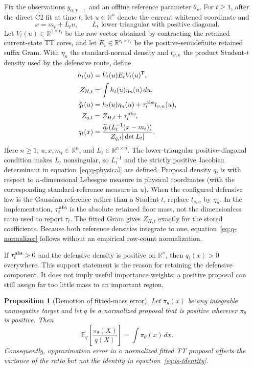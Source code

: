 \documentclass[11pt]{article}
\newtheorem{proposition}{Proposition}
\begin{document}
Fix the observations $y_{0:T-1}$ and an offline reference parameter
$\theta_\star$. For $t\geq1$, after the direct C2 fit at time $t$, let
$u\in\mathbb R^n$ denote the current whitened coordinate and
\begin{equation}\label{eq:proposal-map}
x=m_t+L_tu,
\qquad L_t\text{ lower triangular with positive diagonal}.
\end{equation}
Let $V_t(u)\in\mathbb R^{1\times r_t}$ be the row vector obtained by
contracting the retained current-state TT cores, and let
$E_t\in\mathbb R^{r_t\times r_t}$ be the positive-semidefinite retained suffix
Gram. With $\eta_n$ the standard-normal density and $t_{\nu,n}$ the product
Student-$t$ density used by the defensive route, define
\begin{align}
h_t(u)&=V_t(u)E_tV_t(u)^\mathsf T,\\
Z_{H,t}&=\int h_t(u)\eta_n(u)\,du,\\
\widetilde q_t(u)&=h_t(u)\eta_n(u)+\tau_t^{\rm abs}t_{\nu,n}(u),\\
Z_{q,t}&=Z_{H,t}+\tau_t^{\rm abs},\label{eq:q-normalizer}\\
q_t(x)&=\frac{\widetilde q_t(L_t^{-1}(x-m_t))}
 {Z_{q,t}|\det L_t|}.\label{eq:q-physical}
\end{align}
Here $n\geq1$, $u,x,m_t\in\mathbb R^n$, and
$L_t\in\mathbb R^{n\times n}$. The lower-triangular positive-diagonal
condition makes $L_t$ nonsingular, so $L_t^{-1}$ and the strictly positive
Jacobian determinant in equation~\eqref{eq:q-physical} are defined. Proposal
density $q_t$ is with respect to $n$-dimensional Lebesgue measure in physical
coordinates (with the corresponding standard-reference measure in $u$).
When the configured defensive law is the Gaussian reference rather than a
Student-$t$, replace $t_{\nu,n}$ by $\eta_n$. In the implementation,
$\tau_t^{\rm abs}$ is the absolute retained floor mass, not the dimensionless
ratio used to report $\tau_t$. The fitted Gram gives $Z_{H,t}$ exactly for the
stored coefficients. Because both reference densities integrate to one,
equation~\eqref{eq:q-normalizer} follows without an empirical row-count
normalization.

If $\tau_t^{\rm abs}>0$ and the defensive density is positive on
$\mathbb R^n$, then $q_t(x)>0$ everywhere. This support statement is the
reason for retaining the defensive component. It does not imply useful
importance weights: a positive proposal can still assign far too little mass
to an important region.

\begin{proposition}[Demotion of fitted-mass error]\label{prop:mass-demotion}
Let $\pi_\theta(x)$ be any integrable nonnegative target and let $q$ be a
normalized proposal that is positive wherever $\pi_\theta$ is positive. Then
\begin{equation}\label{eq:is-identity}
\mathbb E_q\!\left[\frac{\pi_\theta(X)}{q(X)}\right]
=\int\pi_\theta(x)\,dx.
\end{equation}
Consequently, approximation error in a normalized fitted TT proposal affects
the variance of the ratio but not the identity in
equation~\eqref{eq:is-identity}.
\end{proposition}
\end{document}
